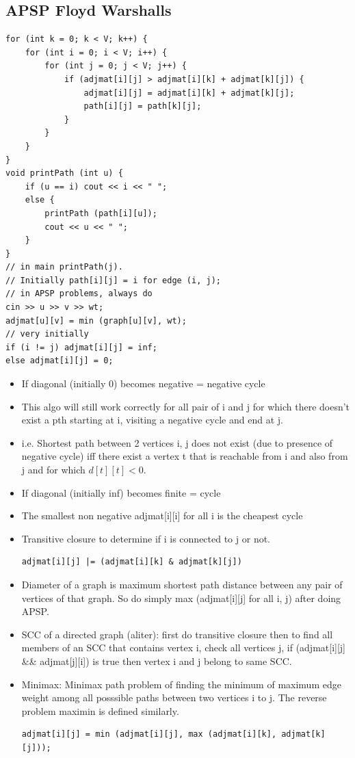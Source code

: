 \documentclass[8pt, a4paper, oneside, twocolumn]{extarticle}
\begin{document}
\subsection{APSP Floyd Warshalls}
\begin{verbatim}
for (int k = 0; k < V; k++) {
    for (int i = 0; i < V; i++) {
        for (int j = 0; j < V; j++) {
            if (adjmat[i][j] > adjmat[i][k] + adjmat[k][j]) {
                adjmat[i][j] = adjmat[i][k] + adjmat[k][j];
                path[i][j] = path[k][j];
            }
        }
    }
}
void printPath (int u) {
    if (u == i) cout << i << " ";
    else {
        printPath (path[i][u]);
        cout << u << " ";
    }
}
// in main printPath(j).
// Initially path[i][j] = i for edge (i, j);
// in APSP problems, always do 
cin >> u >> v >> wt;
adjmat[u][v] = min (graph[u][v], wt);
// very initially
if (i != j) adjmat[i][j] = inf;
else adjmat[i][j] = 0;
\end{verbatim}
\begin{itemize}
    \item If diagonal (initially 0) becomes negative = negative cycle
    \item This algo will still work correctly for all pair of i and j for which there doesn't exist a pth starting at i, visiting a negative cycle and end at j.
    \item i.e. Shortest path between 2 vertices i, j does not exist (due to presence of negative cycle) iff there exist a vertex t that is reachable from i and also from j and for which $d[t][t] < 0$.
    \item If diagonal (initially inf) becomes finite = cycle
    \item The smallest non negative adjmat[i][i] for all i is the cheapest cycle
    \item Transitive closure to determine if i is connected to j or not.
    \begin{verbatim}
adjmat[i][j] |= (adjmat[i][k] & adjmat[k][j])
    \end{verbatim}
    \item Diameter of a graph is maximum shortest path distance between any pair of vertices of that graph. So do simply max (adjmat[i][j] for all i, j) after doing APSP.
    \item SCC of a directed graph (aliter): first do transitive closure then to find all members of an SCC that contains vertex i, check all vertices j, if (adjmat[i][j] \&\& adjmat[j][i]) is true then vertex i and j belong to same SCC.
    \item Minimax: Minimax path problem of finding the minimum of maximum edge weight among all posssible paths between two vertices i to j. The reverse problem maximin is defined similarly.
    \begin{verbatim}
adjmat[i][j] = min (adjmat[i][j], max (adjmat[i][k], adjmat[k][j]));
    \end{verbatim}
\end{itemize}
\end{document}
